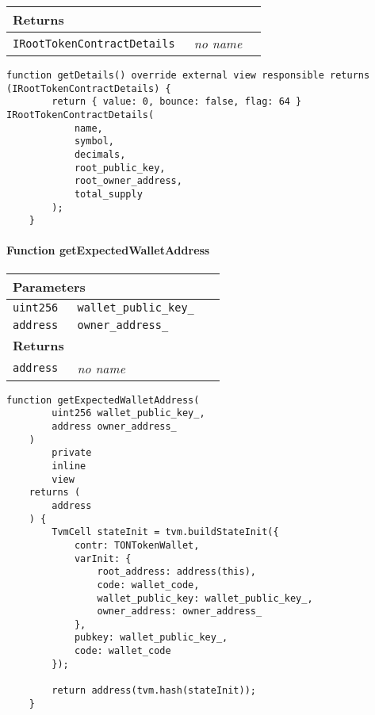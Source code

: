 \ifsoltables
\noindent\begin{tabular}{|l|l|p{5cm}|}\hline
\multicolumn{3}{|l|}{\bf Returns}\\\hline
\tt IRootTokenContractDetails & {\em no name} &\\\hline
\end{tabular}
\fi

\vspace{2cm}

\begin{lstlisting}[firstnumber=77]
    function getDetails() override external view responsible returns (IRootTokenContractDetails) {
        return { value: 0, bounce: false, flag: 64 } IRootTokenContractDetails(
            name,
            symbol,
            decimals,
            root_public_key,
            root_owner_address,
            total_supply
        );
    }
\end{lstlisting}

\paragraph{Function getExpectedWalletAddress}


\ifsoltables
\noindent\begin{tabular}{|l|l|p{5cm}|}\hline
\multicolumn{3}{|l|}{\bf Parameters}\\\hline
\tt uint256 & \tt wallet\_{}public\_{}key\_{} &\\\hline
\tt address & \tt owner\_{}address\_{} &\\\hline
\multicolumn{3}{|l|}{\bf Returns}\\\hline
\tt address & {\em no name} &\\\hline
\end{tabular}
\fi

\vspace{2cm}

\begin{lstlisting}[firstnumber=485]
    function getExpectedWalletAddress(
        uint256 wallet_public_key_,
        address owner_address_
    )
        private
        inline
        view
    returns (
        address
    ) {
        TvmCell stateInit = tvm.buildStateInit({
            contr: TONTokenWallet,
            varInit: {
                root_address: address(this),
                code: wallet_code,
                wallet_public_key: wallet_public_key_,
                owner_address: owner_address_
            },
            pubkey: wallet_public_key_,
            code: wallet_code
        });

        return address(tvm.hash(stateInit));
    }
\end{lstlisting}

